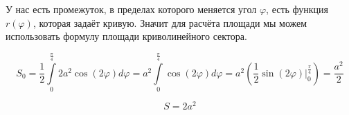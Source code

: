 \documentclass[../main.tex]{subfiles}
\begin{document}
\begin{example}
    У нас есть промежуток, в пределах которого меняется угол \( \varphi \), есть функция \( r\left( \varphi \right)\), которая задаёт кривую. Значит
    для расчёта площади мы можем использовать формулу площади криволинейного сектора. 

    \[ S_0= \dfrac{ 1}{ 2} \displaystyle\int\limits_{ 0}^{ \frac{ \pi}{ 4}} 2a^2\cos\left( 2 \varphi \right)d \varphi =a^2 \displaystyle\int\limits_{ 0}^{ \frac{ \pi}{ 4}} \cos \left( 2 \varphi \right)d \varphi = a^2\left( \dfrac{ 1}{ 2} \sin\left( 2 \varphi \right)|_{0}^{\frac{ \pi}{ 4}}\right) = \dfrac{ a^2}{ 2}\]

    \[ \boxed{S=2a^2}\]
\end{example}
\end{document}

